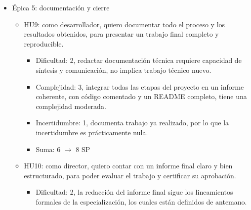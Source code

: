 \documentclass[
11pt, %
]{charter}
\begin{document}
\begin{itemize}
\begin{itemize}
\begin{itemize}
      \end{itemize}
      \item HU8: como director, quiero revisar los resultados del modelo comparados con el estado del arte, para validar el aporte académico del trabajo.
      \begin{itemize}
        \item Dificultad: 1, la búsqueda y síntesis bibliográfica es una tarea conocida en el ámbito académico.
        \item Complejidad: 2, construir una tabla comparativa requiere seleccionar métricas homogéneas entre trabajos que pueden usar 
        metodologías distintas, lo que agrega algo de complejidad.
        \item Incertidumbre: 3, existe incertidumbre moderada sobre si los resultados propios serán comparables con los de la literatura, ya que depende
         del desempeño final del modelo, desconocido en esta etapa.
        \item Suma: 6 $\rightarrow$ 8 SP
      \end{itemize}
    \end{itemize}
  \item Épica 5: documentación y cierre
    \begin{itemize}
      \item HU9: como desarrollador, quiero documentar todo el proceso y los resultados obtenidos, para presentar un trabajo final completo y reproducible.
      \begin{itemize}
        \item Dificultad: 2, redactar documentación técnica requiere capacidad de síntesis y comunicación, no implica trabajo técnico nuevo.
        \item Complejidad: 3, integrar todas las etapas del proyecto en un informe coherente, con código comentado y un README completo, tiene una complejidad moderada.
        \item Incertidumbre: 1, documenta trabajo ya realizado, por lo que la incertidumbre es prácticamente nula.
        \item Suma: 6 $\rightarrow$ 8 SP
      \end{itemize}
      \item HU10: como director, quiero contar con un informe final claro y bien estructurado, para poder evaluar el trabajo y certificar su aprobación.
      \begin{itemize}
        \item Dificultad: 2, la redacción del informe final sigue los lineamientos formales de la especialización, los cuales están definidos de antemano.

\end{itemize}
\end{itemize}
\end{itemize}
\end{document}
